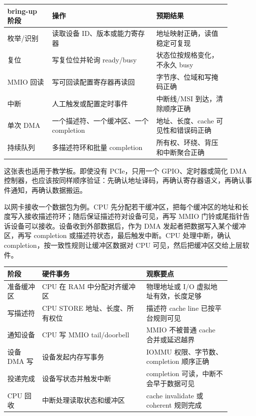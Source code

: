\begin{longtable}{L{0.18\linewidth}L{0.42\linewidth}L{0.3\linewidth}}
\toprule
bring-up 阶段 & 操作 & 预期结果 \\
\midrule
枚举/识别 & 读取设备 ID、版本或能力寄存器 & 地址映射正确，读值稳定可复现 \\
复位 & 写复位位并轮询 ready/busy & 状态位按规格变化，不永久 busy \\
MMIO 回读 & 写可回读配置寄存器再读回 & 字节序、位域和写掩码正确 \\
中断 & 人工触发或配置定时事件 & 中断线/MSI 到达，清除顺序正确 \\
单次 DMA & 一个描述符、一个缓冲区、一个 completion & 地址、长度、cache 可见性和错误码正确 \\
持续队列 & 多描述符环和批量 completion & 所有权、环绕、背压和中断聚合正确 \\
\bottomrule
\end{longtable}

这张表也适用于教学板。即使没有 PCIe，只用一个 GPIO、定时器或简化 DMA 控制器，也应该按同样顺序验证：先确认地址译码，再确认寄存器语义，再确认事件通知，再确认数据搬运。

以网卡接收一个数据包为例。CPU 先分配若干缓冲区，把每个缓冲区的地址和长度写入接收描述符环；随后保证描述符对设备可见，再写 MMIO 门铃或尾指针告诉设备可以接收。设备收到外部数据后，作为 DMA 发起者把数据写入某个缓冲区，再写 completion 或描述符状态，最后触发中断。CPU 处理中断，确认 completion，按一致性规则让缓冲区数据对 CPU 可见，然后把缓冲区交给上层软件。

\begin{longtable}{L{0.14\linewidth}L{0.42\linewidth}L{0.34\linewidth}}
\toprule
阶段 & 硬件事务 & 观察要点 \\
\midrule
准备缓冲区 & CPU 在 RAM 中分配对齐缓冲区 & 物理地址或 I/O 虚拟地址有效，长度足够 \\
写描述符 & CPU STORE 地址、长度、所有权位 & 描述符 cache line 已按平台规则可见 \\
通知设备 & CPU 写 MMIO tail/doorbell & MMIO 不被普通 cache 合并或延迟越界 \\
设备 DMA 写 & 设备发起内存写事务 & IOMMU 权限、字节数、completion 顺序正确 \\
投递完成 & 设备写状态并触发中断 & completion 可读，中断不会早于数据可见 \\
CPU 回收 & 中断处理读取状态和缓冲区 & cache invalidate 或 coherent 规则完成 \\
\bottomrule
\end{longtable}

